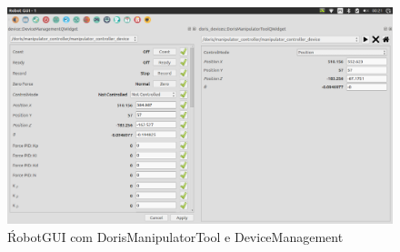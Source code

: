 \begin{figure}[!h]
  \centering
  \includegraphics[width=\linewidth]{./img/screenshot/sc2.png}
  \caption{ŔobotGUI com DorisManipulatorTool e DeviceManagement}
  \label{fig:screenshot2}
\end{figure}

